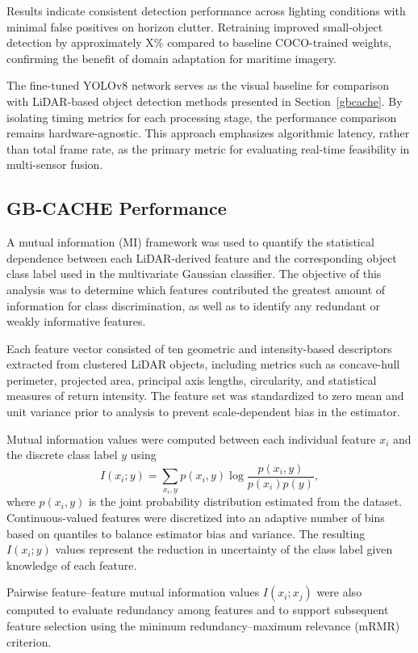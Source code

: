\documentclass{erauthesis}
\begin{document}
Results indicate consistent detection performance across lighting conditions with minimal false positives on horizon clutter.
Retraining improved small-object detection by approximately X\% compared to baseline COCO-trained weights, confirming the benefit of domain adaptation for maritime imagery.

The fine-tuned YOLOv8 network serves as the visual baseline for comparison with LiDAR-based object detection methods presented in Section~\ref{gbcache}.
By isolating timing metrics for each processing stage, the performance comparison remains hardware-agnostic.
This approach emphasizes algorithmic latency, rather than total frame rate, as the primary metric for evaluating real-time feasibility in multi-sensor fusion.

\subsection{GB-CACHE Performance} \label{performance_gbcache}

A mutual information (MI) framework was used to quantify the statistical dependence between each LiDAR-derived feature and the corresponding object class label used in the multivariate Gaussian classifier. 
The objective of this analysis was to determine which features contributed the greatest amount of information for class discrimination, as well as to identify any redundant or weakly informative features.

Each feature vector consisted of ten geometric and intensity-based descriptors extracted from clustered LiDAR objects, including metrics such as concave-hull perimeter, projected area, principal axis lengths, circularity, and statistical measures of return intensity. 
The feature set was standardized to zero mean and unit variance prior to analysis to prevent scale-dependent bias in the estimator.

Mutual information values were computed between each individual feature $x_i$ and the discrete class label $y$ using
\[
I(x_i; y) = \sum_{x_i,y} p(x_i, y) \log \frac{p(x_i, y)}{p(x_i) p(y)},
\]
where $p(x_i, y)$ is the joint probability distribution estimated from the dataset.
Continuous-valued features were discretized into an adaptive number of bins based on quantiles to balance estimator bias and variance.
The resulting $I(x_i; y)$ values represent the reduction in uncertainty of the class label given knowledge of each feature.

Pairwise feature–feature mutual information values $I(x_i; x_j)$ were also computed to evaluate redundancy among features and to support subsequent feature selection using the minimum redundancy–maximum relevance (mRMR) criterion.
\end{document}
